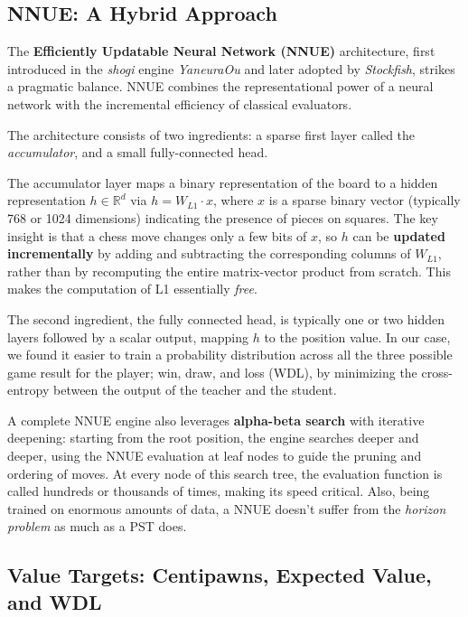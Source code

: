 \subsection{NNUE: A Hybrid Approach}\label{sec:nnue}

The \textbf{Efficiently Updatable Neural Network (NNUE)} architecture, first introduced in the \emph{shogi} engine \emph{YaneuraOu} and later adopted by \emph{Stockfish}, strikes a pragmatic balance. NNUE combines the representational power of a neural network with the incremental efficiency of classical evaluators.

The architecture consists of two ingredients: a sparse first layer called the \emph{accumulator}, and a small fully-connected head.

The accumulator layer maps a binary representation of the board to a hidden representation \(h \in \mathbb{R}^{d}\) via \(h = W_{L1} \cdot x\), where \(x\) is a sparse binary vector (typically 768 or 1024 dimensions) indicating the presence of pieces on squares. The key insight is that a chess move changes only a few bits of \(x\), so \(h\) can be \textbf{updated incrementally} by adding and subtracting the corresponding columns of \(W_{L1}\), rather than by recomputing the entire matrix-vector product from scratch. This makes the computation of L1 essentially \emph{free}.

The second ingredient, the fully connected head, is typically one or two hidden layers followed by a scalar output, mapping \(h\) to the position value. In our case, we found it easier to train a probability distribution across all the three possible game result for the player; win, draw, and loss (WDL), by minimizing the cross-entropy between the output of the teacher and the student.

A complete NNUE engine also leverages \textbf{alpha-beta search} with iterative deepening: starting from the root position, the engine searches deeper and deeper, using the NNUE evaluation at leaf nodes to guide the pruning and ordering of moves. At every node of this search tree, the evaluation function is called hundreds or thousands of times, making its speed critical. Also, being trained on enormous amounts of data, a NNUE doesn't suffer from the \emph{horizon problem} as much as a PST does.

\subsection{Value Targets: Centipawns, Expected Value, and WDL}\label{sec:value-targets}

